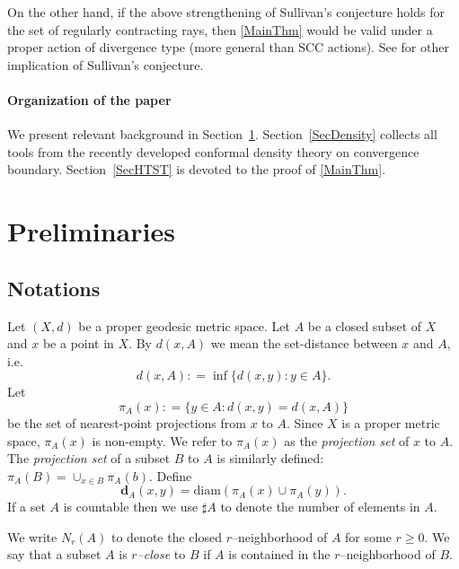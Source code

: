 \documentclass{amsart}
\theoremstyle{definition}
\theoremstyle{remark}
\newcommand{\U}{ X}
\newcommand{\proj}{\textbf{d}}
\begin{document}
On the other hand, if  the above strengthening of Sullivan's conjecture holds for the set of regularly contracting rays, then \ref{MainThm} would be valid under a proper action of divergence type (more general than SCC actions). See \cite[Sec. 6]{FM20} for other implication of Sullivan's conjecture. 
\newline
\paragraph{\textbf{Organization of the paper}} 
We present relevant background in Section~\ref{SecPrelim}. Section~\ref{SecDensity} collects all tools from the recently developed conformal density theory on convergence boundary. Section~\ref{SecHTST} is devoted to the proof of \ref{MainThm}.





\section{Preliminaries}\label{SecPrelim}
 

\subsection{Notations}
Let $(\U, d)$ be a proper geodesic metric space.  Let $A$ be a closed subset of $\U$ and $x$ be a point in $\U$.  By $d(x, A)$ we mean the set-distance 
between $x$ and $A$, i.e. 
\[
d(x, A) : = \inf \big \{ d(x, y): y \in A \big \}. 
\]
Let
\[ \pi_{A}(x) : = \big \{ y\in A: d(x, y) = d(x, A) \big \} \]
be the set of nearest-point projections from $x$ to $A$. Since $\U$ is a proper metric space, 
$\pi_{A}(x)$ is non-empty. We refer to $\pi_{A}(x) $ as the \emph{projection set} of $x$ to $A$. The \textit{projection set} of a subset $B$ to $A$ is similarly defined: $\pi_A(B)=\cup_{x\in B}\pi_A(b)$. Define 
$$
\proj_A(x,y)=\mathrm{diam}(\pi_A(x)\cup\pi_A(y)).
$$ 
If a set $A$ is countable then we use $\sharp A$ to denote the number of elements in $A$.

We write $N_r(A)$ to denote the closed $r$--neighborhood of $A$ for some $r\ge 0$.
We say that a subset $A$ is \textit{$r$--close} to $B$ if $A$ is contained in the $r$--neighborhood of $B$. %
\end{document}
